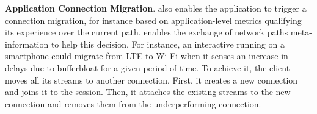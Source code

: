 \textbf{Application Connection Migration}. \tcpls also enables the 
application
to trigger a connection migration, for instance based on application-level 
metrics qualifying its experience over the current path. %
\tcpls enables the exchange of network paths meta-information to help this 
decision.
For instance, an interactive running on a smartphone could migrate from 
LTE to Wi-Fi when it senses an increase in delays due to bufferbloat for a 
given period of time.
To achieve it, the client moves all its \tcpls streams to another \tcp 
connection.
First, it creates a new \tcp connection and joins it to the 
\tcpls
session. Then, %
it attaches the existing streams to the new
connection 
and removes them from the underperforming connection.

